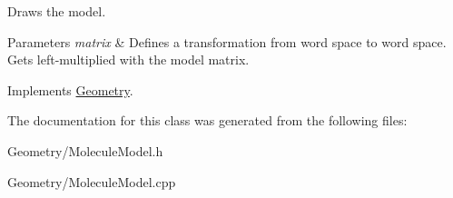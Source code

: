 Draws the model.


\begin{DoxyParams}{Parameters}
{\em matrix} & Defines a transformation from word space to word space. Gets left-\/multiplied with the model matrix. \\
\hline
\end{DoxyParams}


Implements \mbox{\hyperlink{class_geometry_a417f18c0d1f3c8a09ee93023c0a8330d}{Geometry}}.



The documentation for this class was generated from the following files\+:\begin{DoxyCompactItemize}
\item 
Geometry/Molecule\+Model.\+h\item 
Geometry/Molecule\+Model.\+cpp\end{DoxyCompactItemize}
